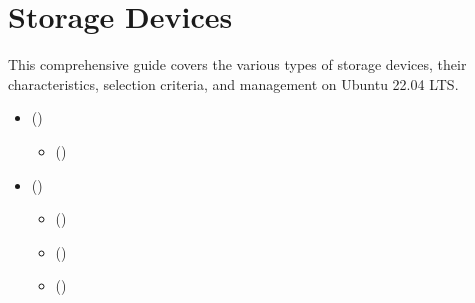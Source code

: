 \documentclass[letterpaper,10pt,english]{sphinxmanual}
\begin{document}
\sphinxstepscope


\chapter{Storage Devices}
\label{\detokenize{storage-devices:storage-devices}}\label{\detokenize{storage-devices::doc}}
\sphinxAtStartPar
This comprehensive guide covers the various types of storage devices, their characteristics, selection criteria, and management on Ubuntu 22.04 LTS.

\begin{sphinxcontents}
\begin{itemize}
\item {} 
\sphinxAtStartPar
{}\label{\detokenize{storage-devices:id2}}{\hyperref[\detokenize{storage-devices:overview-of-storage-devices}]{}} ()
\begin{itemize}
\item {} 
\sphinxAtStartPar
{}\label{\detokenize{storage-devices:id3}}{\hyperref[\detokenize{storage-devices:classification-by-technology}]{}} ()

\end{itemize}

\item {} 
\sphinxAtStartPar
{}\label{\detokenize{storage-devices:id4}}{\hyperref[\detokenize{storage-devices:hard-disk-drives-hdds}]{}} ()
\begin{itemize}
\item {} 
\sphinxAtStartPar
{}\label{\detokenize{storage-devices:id5}}{\hyperref[\detokenize{storage-devices:technology-overview}]{}} ()

\item {} 
\sphinxAtStartPar
{}\label{\detokenize{storage-devices:id6}}{\hyperref[\detokenize{storage-devices:types-of-hdds}]{}} ()

\item {} 
\sphinxAtStartPar
{}\label{\detokenize{storage-devices:id7}}{\hyperref[\detokenize{storage-devices:hdd-management-commands}]{}} ()


\end{itemize}
\end{itemize}
\end{sphinxcontents}
\end{document}
